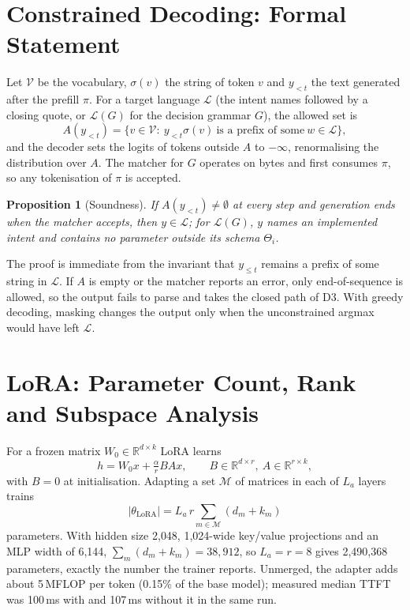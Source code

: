 \documentclass[10pt,twocolumn,letterpaper]{article}
\newtheorem{proposition}{Proposition}
\theoremstyle{definition}
\begin{document}
\section{Constrained Decoding: Formal Statement}\label{app:constrained}\label{sec:constrained}

Let $\mathcal{V}$ be the vocabulary, $\sigma(v)$ the string of token $v$ and $y_{<t}$ the text
generated after the prefill $\pi$. For a target language $\mathcal{L}$ (the intent names followed by
a closing quote, or $\mathcal{L}(G)$ for the decision grammar $G$), the allowed set is
\begin{equation*}
A(y_{<t})=\{v\in\mathcal{V}:\ y_{<t}\sigma(v)\ \text{is a prefix of some}\ w\in\mathcal{L}\},
\end{equation*}
and the decoder sets the logits of tokens outside $A$ to $-\infty$, renormalising the distribution
over $A$. The matcher for $G$ operates on bytes and first consumes $\pi$, so any tokenisation of
$\pi$ is accepted.

\begin{proposition}[Soundness]
If $A(y_{<t})\neq\emptyset$ at every step and generation ends when the matcher accepts, then
$y\in\mathcal{L}$; for $\mathcal{L}(G)$, $y$ names an implemented intent and contains no parameter
outside its schema $\Theta_i$.
\end{proposition}
\noindent The proof is immediate from the invariant that $y_{\le t}$ remains a prefix of some string
in $\mathcal{L}$. If $A$ is empty or the matcher reports an error, only end-of-sequence is allowed,
so the output fails to parse and takes the closed path of D3. With greedy decoding, masking changes
the output only when the unconstrained argmax would have left $\mathcal{L}$.

\section{LoRA: Parameter Count, Rank and Subspace Analysis}\label{app:lora}

For a frozen matrix $W_0\in\mathbb{R}^{d\times k}$ LoRA learns
\begin{equation}\label{eq:lora}
h=W_0x+\tfrac{\alpha}{r}BAx,\qquad B\in\mathbb{R}^{d\times r},\ A\in\mathbb{R}^{r\times k},
\end{equation}
with $B=0$ at initialisation. Adapting a set $\mathcal{M}$ of matrices in each of $L_a$ layers trains
\begin{equation}\label{eq:loraparams}
|\theta_{\text{LoRA}}|=L_a\,r\sum_{m\in\mathcal{M}}(d_m+k_m)
\end{equation}
parameters. With hidden size 2{,}048, 1{,}024-wide key/value projections and an MLP width of 6{,}144,
$\sum_m(d_m+k_m)=38{,}912$, so $L_a=r=8$ gives 2{,}490{,}368 parameters, exactly the number the
trainer reports. Unmerged, the adapter adds about 5\,MFLOP per token (0.15\% of the base model);
measured median TTFT was 100\,ms with and 107\,ms without it in the same run.
\end{document}
